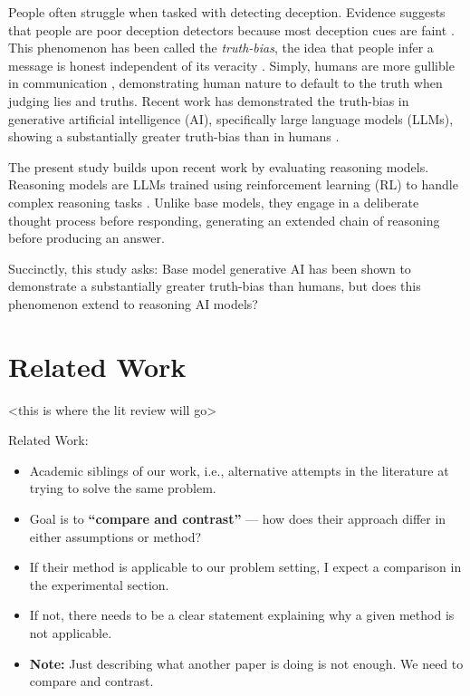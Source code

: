 \documentclass{article}
\begin{document}
People often struggle when tasked with detecting deception. Evidence suggests that people are poor deception detectors because most deception cues are faint \citep{depaulo_cues_2003, hartwig_why_2011,luke_lessons_2019}. This phenomenon has been called the \textit{truth-bias}, the idea that people infer a message is honest independent of its veracity \citep{levine_truth-default_2014, mclaughlin_communication_2012}. Simply, humans are more gullible in communication \citep{levine_duped_2020}, demonstrating human nature to default to the truth when judging lies and truths. Recent work has demonstrated the truth-bias in generative artificial intelligence (AI), specifically large language models (LLMs), showing a substantially greater truth-bias than in humans \citep{markowitz_generative_2024}.

The present study builds upon recent work \citep{markowitz_generative_2024} by evaluating reasoning models. Reasoning models are LLMs trained using reinforcement learning (RL) to handle complex reasoning tasks \citep{openai_reasoning_2025}. Unlike base models, they engage in a deliberate thought process before responding, generating an extended chain of reasoning before producing an answer.

Succinctly, this study asks: Base model generative AI has been shown to demonstrate a substantially greater truth-bias than humans, but does this phenomenon extend to reasoning AI models?

\section{Related Work}



<this is where the lit review will go>

Related Work:

\begin{itemize}
    \item Academic siblings of our work, i.e., alternative attempts in the literature at trying to solve the same problem.
    \item Goal is to \textbf{“compare and contrast”} — how does their approach differ in either assumptions or method?
    \item If their method is applicable to our problem setting, I expect a comparison in the experimental section.
    \item If not, there needs to be a clear statement explaining why a given method is not applicable.
    \item \textbf{Note:} Just describing what another paper is doing is not enough. We need to compare and contrast.
\end{itemize}
\end{document}
